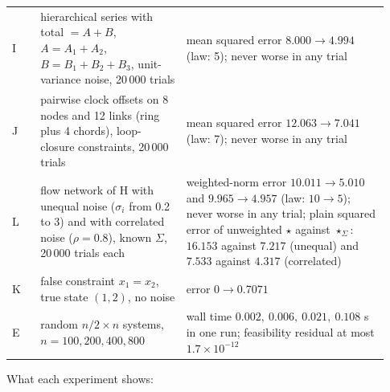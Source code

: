 \documentclass[11pt,letterpaper]{article}
\theoremstyle{plain}
\theoremstyle{definition}
\theoremstyle{remark}
\begin{document}
\begin{center}
\begin{tabular}{@{}>{\raggedright\arraybackslash}p{0.07\linewidth}>{\raggedright\arraybackslash}p{0.36\linewidth}>{\raggedright\arraybackslash}p{0.5\linewidth}@{}}
I & 8 hierarchical series with total $=A+B$, $A=A_1+A_2$, $B=B_1+B_2+B_3$, unit-variance noise, 20\,000 trials & mean squared error $8.000\to4.994$ (law: 5); never worse in any trial\\
J & pairwise clock offsets on 8 nodes and 12 links (ring plus 4 chords), loop-closure constraints, 20\,000 trials & mean squared error $12.063\to7.041$ (law: 7); never worse in any trial\\
L & flow network of H with unequal noise ($\sigma_i$ from 0.2 to 3) and with correlated noise ($\rho=0.8$), known $\Sigma$, 20\,000 trials each & weighted-norm error $10.011\to5.010$ and $9.965\to4.957$ (law: $10\to5$); never worse in any trial; plain squared error of unweighted $\star$ against $\star_\Sigma$: $16.153$ against $7.217$ (unequal) and $7.533$ against $4.317$ (correlated)\\
K & false constraint $x_1=x_2$, true state $(1,2)$, no noise & error $0\to0.7071$\\
E & random $n/2\times n$ systems, $n=100,200,400,800$ & wall time $0.002,\ 0.006,\ 0.021,\ 0.108$ s in one run; feasibility residual at most $1.7\times10^{-12}$\\
\bottomrule
\end{tabular}
\end{center}

What each experiment shows:
\end{document}
